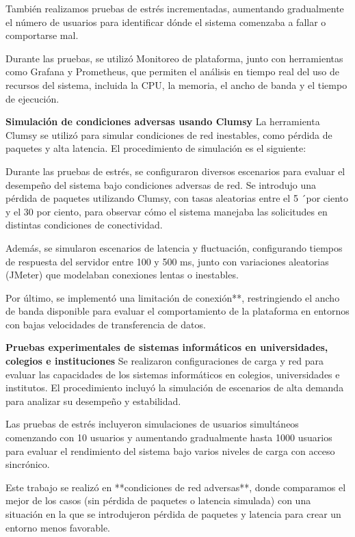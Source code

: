 \documentclass{article}
\begin{document}
También realizamos pruebas de estrés incrementadas, aumentando gradualmente el número de usuarios para identificar dónde el sistema comenzaba a fallar o comportarse mal.

Durante las pruebas, se utilizó Monitoreo de plataforma, junto con herramientas como Grafana y Prometheus, que permiten el análisis en tiempo real del uso de recursos del sistema, incluida la CPU, la memoria, el ancho de banda y el tiempo de ejecución.

\textbf{Simulación de condiciones adversas usando Clumsy}
La herramienta Clumsy se utilizó para simular condiciones de red inestables, como pérdida de paquetes y alta latencia. El procedimiento de simulación es el siguiente:

Durante las pruebas de estrés, se configuraron diversos escenarios para evaluar el desempeño del sistema bajo condiciones adversas de red. Se introdujo una pérdida de paquetes utilizando Clumsy, con tasas aleatorias entre el 5 ´por ciento y el 30 por ciento, para observar cómo el sistema manejaba las solicitudes en distintas condiciones de conectividad.  

Además, se simularon escenarios de latencia y fluctuación, configurando tiempos de respuesta del servidor entre 100 y 500 ms, junto con variaciones aleatorias (JMeter) que modelaban conexiones lentas o inestables.  

Por último, se implementó una limitación de conexión**, restringiendo el ancho de banda disponible para evaluar el comportamiento de la plataforma en entornos con bajas velocidades de transferencia de datos.

\textbf{Pruebas experimentales de sistemas informáticos en  universidades, colegios e instituciones}
Se realizaron configuraciones de carga y red para evaluar las capacidades de los sistemas informáticos en colegios, universidades e institutos. El procedimiento incluyó la simulación de escenarios de alta demanda para analizar su desempeño y estabilidad.

Las pruebas de estrés incluyeron simulaciones de usuarios simultáneos comenzando con 10 usuarios y aumentando gradualmente hasta 1000 usuarios para evaluar el rendimiento del sistema bajo varios niveles de carga con acceso sincrónico.

Este trabajo se realizó en **condiciones de red adversas**, donde comparamos el mejor de los casos (sin pérdida de paquetes o latencia simulada) con una situación en la que se introdujeron pérdida de paquetes y latencia para crear un entorno menos favorable.
\end{document}
